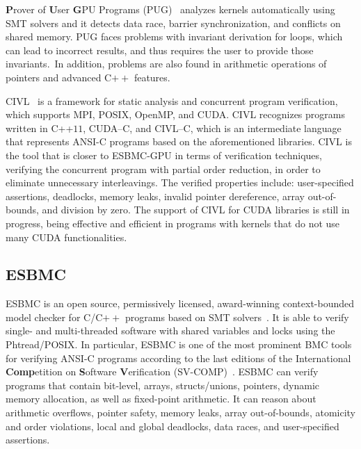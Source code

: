 \documentclass[times, doublespace]{cpeauth}
\begin{document}
\textbf{P}rover of \textbf{U}ser \textbf{G}PU Programs (PUG)~\cite{Li:2010} analyzes kernels automatically using SMT solvers and it detects data race, barrier synchronization, and conflicts on shared memory. PUG faces problems with invariant derivation for loops, which can lead to incorrect results, and thus requires the user to provide those invariants.\ In addition, problems are also found in arithmetic operations of pointers and advanced C$++$ features.

CIVL~\cite{civl:2015} is a framework for static analysis and concurrent program verification, which supports MPI, POSIX, OpenMP, and CUDA. CIVL recognizes programs written in C++$11$, CUDA--C, and CIVL--C, which is an intermediate language that represents ANSI-C programs based on the aforementioned libraries. CIVL is the tool that is closer to ESBMC-GPU in terms of verification techniques, verifying the concurrent program with partial order reduction, in order to eliminate unnecessary interleavings. The verified properties include: user-specified assertions, deadlocks, memory leaks, invalid pointer dereference, array out-of-bounds, and division by zero. The support of CIVL for CUDA libraries is still in progress, being effective and efficient in programs with kernels that do not use many CUDA functionalities.

\subsection{ESBMC}
\vspace{-2pt}
\label{ssec:esbmc}

ESBMC is an open source, permissively licensed, award-winning context-bounded model checker for C/C$++$ programs based on SMT solvers~\cite{cordeiro:2011,cordeiro:2012,Morse11,Morse:15}. It is able to verify single- and multi-threaded software with shared variables and locks using the Phtread/POSIX. In particular, ESBMC is one of the most prominent BMC tools for verifying ANSI-C programs according to the last editions of the International \textbf{Comp}etition on \textbf{S}oftware \textbf{V}erification (SV-COMP)~\cite{svcomp2014,svcomp2015}. ESBMC can verify programs that contain bit-level, arrays, structs/unions, pointers, dynamic memory allocation, as well as fixed-point arithmetic. It can reason about arithmetic overflows, pointer safety, memory leaks, array out-of-bounds, atomicity and order violations, local and global deadlocks, data races, and user-specified assertions.
\end{document}
